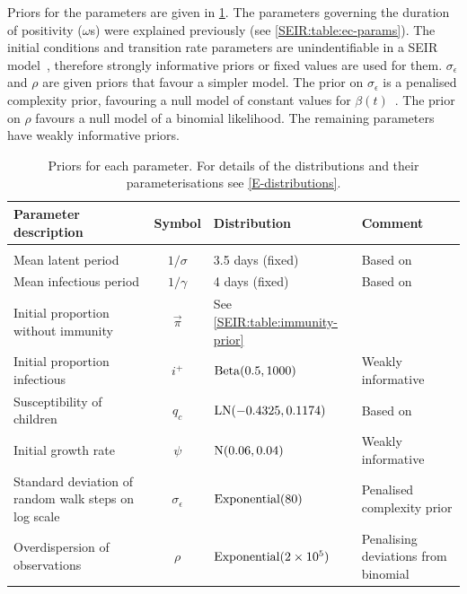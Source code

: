 \documentclass[thesis.tex]{subfiles}
\begin{document}
Priors for the parameters are given in \cref{SEIR:table:priors}.
The parameters governing the duration of positivity ($\omega$s) were explained previously (see \cref{SEIR:table:ec-params}).
The initial conditions and transition rate parameters are unindentifiable in a SEIR model~\autocite{dankwaStructural}, therefore strongly informative priors or fixed values are used for them.
$\sigma_\epsilon$ and $\rho$ are given priors that favour a simpler model.
The prior on $\sigma_\epsilon$ is a penalised complexity prior, favouring a null model of constant values for $\beta(t)$~\autocite{simpsonPenalising}.
The prior on $\rho$ favours a null model of a binomial likelihood.
The remaining parameters have weakly informative priors.
\begin{landscape}
\begin{table}
\begin{tabular}{l c l l}
    Parameter description & Symbol & Distribution & Comment \\
    \hline \\
    Mean latent period & $1/\sigma$ & 3.5 days (fixed) & Based on \textcite{zhaoEstimating} \\
    Mean infectious period & $1/\gamma$ & 4 days (fixed) & Based on \textcite{zhaoEstimating} \\
    Initial proportion without immunity & $\vec\pi$ & See \cref{SEIR:table:immunity-prior} & \\
    Initial proportion infectious & $i^+$ & $\operatorname{Beta}(0.5, 1000)$ & Weakly informative \\
    Susceptibility of children & $q_c$ & $\operatorname{LN}(-0.4325, 0.1174)$ & Based on \textcite{vinerTransmission}  \\
    Initial growth rate & $\psi$ & $\operatorname{N}(0.06, 0.04)$ & Weakly informative \\
    Standard deviation of random walk steps on log scale & $\sigma_\epsilon$ & $\operatorname{Exponential}(80)$ & Penalised complexity prior \\
    Overdispersion of observations & $\rho$ & $\operatorname{Exponential}(2 \times 10^5)$ & Penalising deviations from binomial
\end{tabular}
\caption[SEIR model priors]{Priors for each parameter. For details of the distributions and their parameterisations see \cref{E-distributions}.}
\label{SEIR:table:priors}
\end{table}


\end{landscape}
\end{document}
